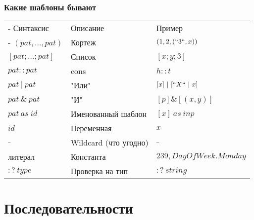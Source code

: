 \documentclass[xetex,mathserif,serif]{beamer}
\begin{document}
	\begin{frame}
		\frametitle{Какие шаблоны бывают}
		\begin{small}
			\begin{tabu} {| X[0.9 l p] | X[1 l p] | X[1 l p] |}
				\tabucline-
				Синтаксис                               & Описание                  & Пример                                \\
				\tabucline-
				\everyrow{\tabucline-}
				$(pat, \ldots, pat)$                    & Кортеж                    & $(1, 2, (``3``, x))$                    \\
				$[pat; \ldots; pat]$                       & Список                    & $[x; y; 3]$                           \\
				$pat :: pat$                            & cons                      & $h :: t$                              \\
				$pat\ |\ pat$                             & "Или"                     & $[x]\ |\ [``X``\ |\ x]$                     \\
				$pat\ \&\ pat$                            & "И"                       & $[p] \& [(x, y)]$                     \\
				$pat\ as\ id$                             & Именованный шаблон        & $[x]\ as\ inp$                          \\
				$id$                                    & Переменная                & $x$                                   \\
				$\_$                                     & Wildcard (что угодно)     & $\_$                                   \\
				литерал                               & Константа                 & $239, DayOfWeek.Monday$ \\
				$:?\ type$                               & Проверка на тип           & $:?\ string$                           \\
			\end{tabu}
		\end{small}
	\end{frame}

	\section{Последовательности}
	
\end{document}

